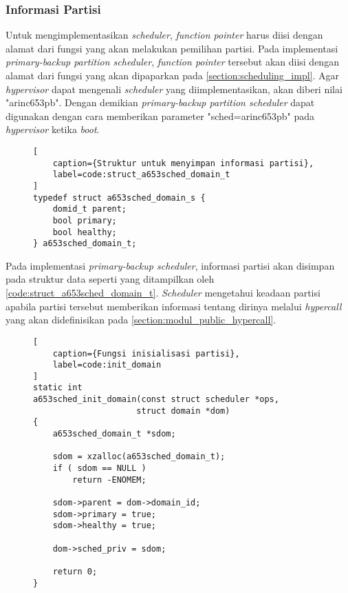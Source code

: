 \subsubsection{Informasi Partisi}
\label{section:informasi_partisi_impl}

Untuk mengimplementasikan \textit{scheduler}, \textit{function pointer} 
harus diisi dengan alamat dari fungsi yang akan melakukan pemilihan partisi. Pada implementasi
\textit{primary-backup partition scheduler}, \textit{function pointer} tersebut akan diisi
dengan alamat dari fungsi  yang akan dipaparkan pada
\autoref{section:scheduling_impl}. Agar \textit{hypervisor} dapat mengenali \textit{scheduler}
yang diimplementasikan,  akan diberi nilai "arinc653pb". Dengan demikian
\textit{primary-backup partition scheduler} dapat digunakan dengan cara memberikan parameter
"sched=arinc653pb" pada \textit{hypervisor} ketika \textit{boot}.

\begin{figure}
\begin{lstlisting}[
	caption={Struktur untuk menyimpan informasi partisi},
	label=code:struct_a653sched_domain_t
]
typedef struct a653sched_domain_s {
    domid_t parent;
    bool primary;
    bool healthy;
} a653sched_domain_t;
\end{lstlisting}
\end{figure}

Pada implementasi \textit{primary-backup scheduler}, informasi partisi akan disimpan pada
struktur data seperti yang ditampilkan oleh \autoref{code:struct_a653sched_domain_t}.
\textit{Scheduler} mengetahui keadaan partisi apabila partisi tersebut memberikan informasi
tentang dirinya melalui \textit{hypercall} yang akan didefinisikan pada
\autoref{section:modul_public_hypercall}.

\begin{figure}
\begin{lstlisting}[
	caption={Fungsi inisialisasi partisi},
	label=code:init_domain
]
static int
a653sched_init_domain(const struct scheduler *ops,
                     struct domain *dom)
{
    a653sched_domain_t *sdom;

    sdom = xzalloc(a653sched_domain_t);
    if ( sdom == NULL )
        return -ENOMEM;

    sdom->parent = dom->domain_id;
    sdom->primary = true;
    sdom->healthy = true;

    dom->sched_priv = sdom;

    return 0;
}
\end{lstlisting}
\end{figure}

